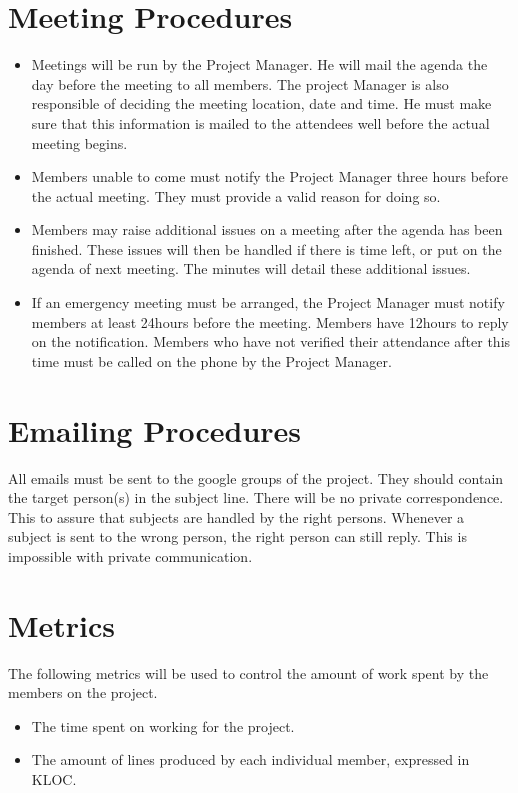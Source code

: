 \documentclass[salesmen, twoside]{softproj}
\begin{document}
\begin{projdoc}
\section{Meeting Procedures}
\begin{itemize}
\item
Meetings will be run by the Project Manager. He will mail the agenda the day before the meeting to all members. The project Manager is also responsible of deciding the meeting location, date and time. He must make sure that this information is mailed to the attendees well before the actual meeting begins.
\item
Members unable to come must notify the Project Manager three hours before the actual meeting. They must provide a valid reason for doing so.
\item
Members may raise additional issues on a meeting after the agenda has been finished. These issues will then be handled if there is time left, or put on the agenda of next meeting. The minutes will detail these additional issues.
\item
If an emergency meeting must be arranged, the Project Manager must notify members at least 24hours before the meeting. Members have 12hours to reply on the notification. Members who have not verified their attendance after this time must be called on the phone by the Project Manager.
\end{itemize}

\section{Emailing Procedures}
All emails must be sent to the google groups of the project. They should contain the target person(s) in the subject line. There will be no private correspondence. This to assure that subjects are handled by the right persons. Whenever a subject is sent to the wrong person, the right person can still reply. This is impossible with private communication.

\section{Metrics}
The following metrics will be used to control the amount of work spent by the members on the project.
\begin{itemize}
\item The time spent on working for the project.
\item The amount of lines produced by each individual member, expressed in KLOC.
\end{itemize}


\end{projdoc}
\end{document}
